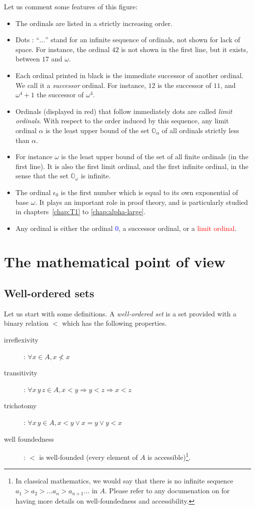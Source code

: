 \documentclass[a4paper]{book}
\begin{document}
Let us comment some features of this figure:

\begin{itemize}
\item The ordinals are listed in a strictly increasing order. 
\item Dots : ``$\ldots$'' stand for an infinite sequence of ordinals, not shown for lack of space. For instance, the ordinal $42$ is not shown in the first line, but it exists, between $17$ and $\omega$.
\item Each ordinal printed in black is the immediate successor of another ordinal. We call it a \emph{successor} ordinal. For instance, $12$ is the successor of $11$, and $\omega^4+1$ the successor of $\omega^4$.
\item Ordinals (displayed in red)  that  follow immediately dots are called \emph{limit ordinals}. With respect to the order induced by this sequence, any limit ordinal $\alpha$ is the least upper bound of  the set $\mathbb{O}_\alpha$ of all ordinals strictly less than $\alpha$.
\item
For instance $\omega$ is the least upper bound of the set of all finite ordinals (in the first line). It is also the first limit ordinal, and the first infinite ordinal, in the sense that 
the set $\mathbb{O}_\omega$ is infinite.
\item The ordinal $\epsilon_0$ is the first number which is equal to its own exponential of base $\omega$. It plays an important role in proof theory, and is particularly studied in chapters~\ref{chap:T1} to \ref{chap:alpha-large}.
\item Any ordinal is  either the ordinal \textcolor{blue}{$0$},
a successor ordinal, or a \textcolor{red}{limit ordinal}.
\end{itemize}




\section{The mathematical point of view}

\subsection{Well-ordered sets}
Let us start with some definitions.
A  \emph{well-ordered set} is a set provided with a binary relation $<$ which has the following properties.
\begin{description}
\item[irreflexivity] : $\forall x\in A, x\not< x$
\item[transitivity] : $\forall x\,y\,z\in A, x<y \Rightarrow y<z \Rightarrow x<z$
\item[trichotomy]: $\forall x\,y\in A, x<y \vee x = y \vee y < x$
\item[well foundedness]: $<$ is well-founded (every element of $A$ is accessible)\footnote{In classical mathematics, we would say that there is no infinite sequence $a_1>a_2> \dots a_n> a_{n+1}\dots$ in $A$. Please refer to any documenation on \coq{} for having more details on well-foundedness and accessibility.}.

\end{description}
\end{document}
